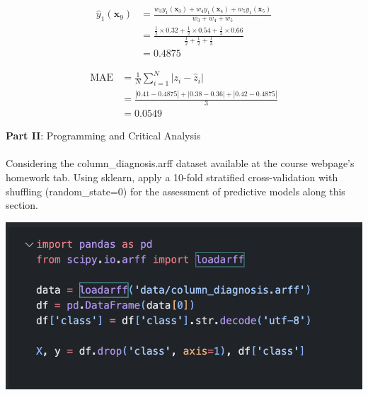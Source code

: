 \documentclass[12pt]{article}
\begin{document}
\begin{enumerate}[leftmargin=\labelsep]
\begin{enumerate}
        \begin{equation}
        \begin{split}
            \hat{y}_1(\mathbf{x}_9) &= \frac{w_3y_1(\mathbf{x}_3) + w_4y_1(\mathbf{x}_4) + w_5y_1(\mathbf{x}_5)}{w_3 + w_4 + w_5} \\
            &= \frac{\frac{1}{2} \times 0.32 + \frac{1}{2} \times 0.54 + \frac{1}{3} \times 0.66}{\frac{1}{2} + \frac{1}{2} + \frac{1}{3}} \\
            &= 0.4875
        \end{split}
        \end{equation}

        \begin{equation}
        \begin{split}            
            \textrm{MAE} &= \frac{1}{N}\sum_{i = 1}^N |z_i - \hat{z}_i| \\
            &=\frac{|0.41 - 0.4875| + |0.38 - 0.36| + |0.42-0.4875|}{3} \\
            &=0.0549
        \end{split}
        \end{equation}
        
    \end{enumerate}
\end{enumerate}

\vskip 1cm

\large{\textbf{Part II}: Programming and Critical Analysis}\normalsize

\paragraph{}Considering the column\_diagnosis.arff dataset available at the course webpage's homework tab.
Using sklearn, apply a 10-fold stratified cross-validation with shuffling (random\_state=0) for the
assessment of predictive models along this section.

\begin{center}
    \includegraphics[scale=0.8]{images/code2.png}
\end{center}
\end{document}

